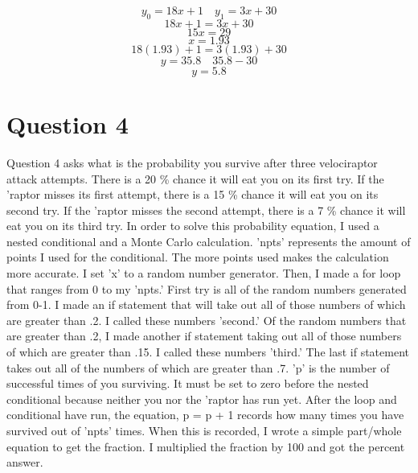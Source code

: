 \documentclass[twocolumn]{revtex4}
\begin{document}
$$y_0=18x+1 \quad y_1=3x+30$$
$$18x+1=3x+30$$
$$15x=29$$ 
$$x=1.93$$
$$18(1.93)+1=3(1.93) +30$$
$$y=35.8 \quad 35.8 - 30$$
$$y=5.8$$

\pagebreak






\section{Question 4}
Question 4 asks what is the probability you survive after three velociraptor attack attempts. There is a 20 \% chance it will eat you on its first try. If the 'raptor misses its first attempt, there is a 15 \% chance it will eat you on its second try. If the 'raptor misses the second attempt, there is a 7 \% chance it will eat you on its third try. In order to solve this probability equation, I used a nested conditional and a Monte Carlo calculation. 'npts' represents the amount of points I used for the conditional. The more points used makes the calculation more accurate. I set 'x' to a random number generator. Then, I made a for loop that ranges from 0 to my 'npts.' First try is all of the random numbers generated from 0-1. I made an if statement that will take out all of those numbers of which are greater than .2. I called these numbers 'second.' Of the random numbers that are greater than .2, I made another if statement taking out all of those numbers of which are greater than .15. I called these numbers 'third.' The last if statement takes out all of the numbers of which are greater than .7. 'p' is the number of successful times of you surviving. It must be set to zero before the nested conditional because neither you nor the 'raptor has run yet. After the loop and conditional have run, the equation, p = p + 1 records how many times you have survived out of 'npts' times. When this is recorded, I wrote a simple part/whole equation to get the fraction. I multiplied the fraction by 100 and got the percent answer.
\end{document}
